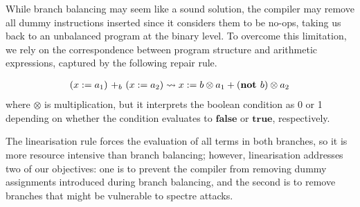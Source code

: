 While branch balancing may seem like a sound solution, the compiler may remove all dummy instructions inserted since it considers them to be no-ops, taking us back to an unbalanced program at the binary level. To overcome this limitation, we rely on the correspondence between program structure and arithmetic expressions, captured by the following repair rule.
\begin{definition}[Linearisation]
\begin{align*}
\branch{b}{(x:=a_1)}{(x:=a_2)} \leadsto x:=b\otimes a_1+(\textbf{not }b)\otimes a_2
\end{align*}
where $\otimes$ is multiplication, but it interprets the boolean condition as 0 or 1 depending on whether the condition evaluates to $\textbf{false}$ or $\textbf{true}$, respectively. 
\end{definition}
The linearisation rule forces the evaluation of all terms in both branches, so it is more resource intensive than branch balancing; however, linearisation addresses two of our objectives: one is to prevent the compiler from removing dummy assignments introduced during branch balancing, and the second is to remove branches that might be vulnerable to spectre attacks.

